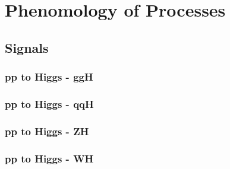 \chapter{Phenomology of Processes}

\section{Signals}

\subsection{pp to Higgs - ggH}

\subsection{pp to Higgs - qqH}

\subsection{pp to Higgs - ZH}

\subsection{pp to Higgs - WH}


